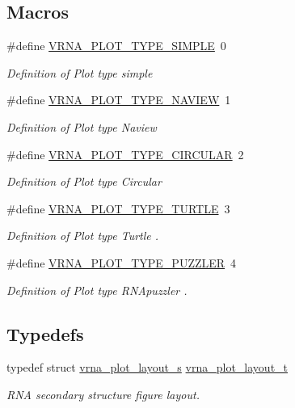 \subsection*{Macros}
\begin{DoxyCompactItemize}
\item 
\#define \mbox{\hyperlink{group__plot__layout__utils_gae6d17b9f0a53cf5205a9181e0f8422e9}{V\+R\+N\+A\+\_\+\+P\+L\+O\+T\+\_\+\+T\+Y\+P\+E\+\_\+\+S\+I\+M\+P\+LE}}~0
\begin{DoxyCompactList}\small\item\em Definition of Plot type {\itshape simple} \end{DoxyCompactList}\item 
\#define \mbox{\hyperlink{group__plot__layout__utils_ga94d4c863ecac2f220f76658afb92f964}{V\+R\+N\+A\+\_\+\+P\+L\+O\+T\+\_\+\+T\+Y\+P\+E\+\_\+\+N\+A\+V\+I\+EW}}~1
\begin{DoxyCompactList}\small\item\em Definition of Plot type {\itshape Naview} \end{DoxyCompactList}\item 
\#define \mbox{\hyperlink{group__plot__layout__utils_ga8c9eac631348da92136c8363ecdd9fb9}{V\+R\+N\+A\+\_\+\+P\+L\+O\+T\+\_\+\+T\+Y\+P\+E\+\_\+\+C\+I\+R\+C\+U\+L\+AR}}~2
\begin{DoxyCompactList}\small\item\em Definition of Plot type {\itshape Circular} \end{DoxyCompactList}\item 
\#define \mbox{\hyperlink{group__plot__layout__utils_ga382c1c5c0b1943500aa4bb55b7658a33}{V\+R\+N\+A\+\_\+\+P\+L\+O\+T\+\_\+\+T\+Y\+P\+E\+\_\+\+T\+U\+R\+T\+LE}}~3
\begin{DoxyCompactList}\small\item\em Definition of Plot type {\itshape Turtle} \cite{wiegreffe:2018}. \end{DoxyCompactList}\item 
\#define \mbox{\hyperlink{group__plot__layout__utils_ga64ec68055e241d11f659edb50f27ecae}{V\+R\+N\+A\+\_\+\+P\+L\+O\+T\+\_\+\+T\+Y\+P\+E\+\_\+\+P\+U\+Z\+Z\+L\+ER}}~4
\begin{DoxyCompactList}\small\item\em Definition of Plot type {\itshape R\+N\+Apuzzler} \cite{wiegreffe:2018}. \end{DoxyCompactList}\end{DoxyCompactItemize}
\subsection*{Typedefs}
\begin{DoxyCompactItemize}
\item 
typedef struct \mbox{\hyperlink{group__plot__layout__utils_structvrna__plot__layout__s}{vrna\+\_\+plot\+\_\+layout\+\_\+s}} \mbox{\hyperlink{group__plot__layout__utils_gac986fe092abc2a6a93ceb5141e4dd28b}{vrna\+\_\+plot\+\_\+layout\+\_\+t}}
\begin{DoxyCompactList}\small\item\em R\+NA secondary structure figure layout. \end{DoxyCompactList}\end{DoxyCompactItemize}
